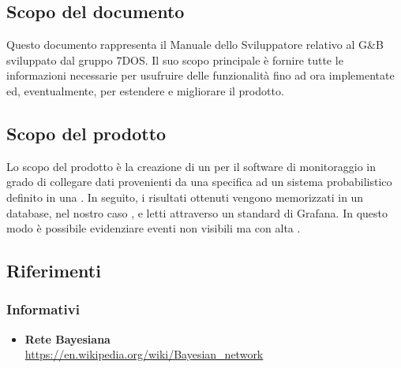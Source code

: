 \subsection{Scopo del documento}
Questo documento rappresenta il Manuale dello Sviluppatore relativo al  G\&B sviluppato dal gruppo 7DOS. Il suo scopo principale è fornire tutte le informazioni necessarie per usufruire delle funzionalità fino ad ora implementate ed, eventualmente, per estendere e migliorare il prodotto.
\subsection{Scopo del prodotto}
Lo scopo del prodotto è la creazione di un  per il software di monitoraggio  in grado di collegare dati provenienti da una specifica  ad un sistema probabilistico definito in una . In seguito, i risultati ottenuti vengono memorizzati in un database, nel nostro caso , e letti attraverso un  standard di Grafana. In questo modo è possibile evidenziare eventi non visibili ma con alta .
\subsection{Riferimenti}
\subsubsection{Informativi}
\begin{itemize}
	\item{\textbf{Rete Bayesiana}\\
		\url{https://en.wikipedia.org/wiki/Bayesian_network}}
\end{itemize}
